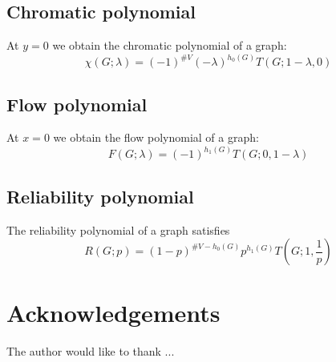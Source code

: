 \documentclass{amsart}
\theoremstyle{definition}
\begin{document}
\subsection{Chromatic polynomial}
At $y=0$ we obtain the chromatic polynomial of a graph:
\begin{equation*}
\chi(G; \lambda) = (-1)^{\#V } (-\lambda)^{h_0(G)} T(G; 1-\lambda,0)
\end{equation*}

\subsection{Flow polynomial}
At $x = 0$ we obtain the flow polynomial of a graph:
\begin{equation*}
F(G; \lambda) = (-1)^{h_1(G)} T(G; 0, 1 - \lambda)
\end{equation*}

\subsection{Reliability polynomial}
The reliability polynomial of a graph satisfies
\begin{equation*}
R(G; p) = (1 - p)^{\# V - h_0(G)} p^{h_1(G)} T(G; 1, \frac1p )
\end{equation*}

\section*{Acknowledgements}
The author would like to thank ...
\end{document}
